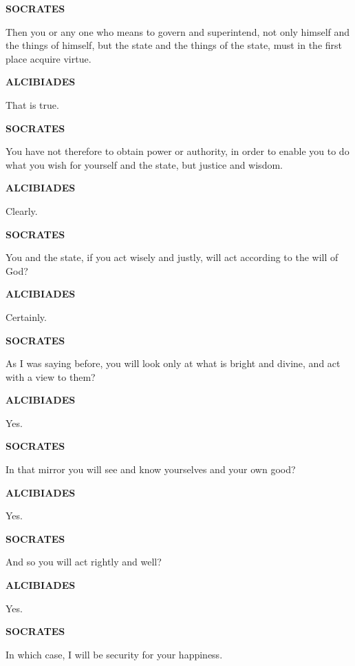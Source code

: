 \documentclass[11pt,letter]{article}
\begin{document}
\par \textbf{SOCRATES}
\par   Then you or any one who means to govern and superintend, not only himself and the things of himself, but the state and the things of the state, must in the first place acquire virtue.

\par \textbf{ALCIBIADES}
\par   That is true.

\par \textbf{SOCRATES}
\par   You have not therefore to obtain power or authority, in order to enable you to do what you wish for yourself and the state, but justice and wisdom.

\par \textbf{ALCIBIADES}
\par   Clearly.

\par \textbf{SOCRATES}
\par   You and the state, if you act wisely and justly, will act according to the will of God?

\par \textbf{ALCIBIADES}
\par   Certainly.

\par \textbf{SOCRATES}
\par   As I was saying before, you will look only at what is bright and divine, and act with a view to them?

\par \textbf{ALCIBIADES}
\par   Yes.

\par \textbf{SOCRATES}
\par   In that mirror you will see and know yourselves and your own good?

\par \textbf{ALCIBIADES}
\par   Yes.

\par \textbf{SOCRATES}
\par   And so you will act rightly and well?

\par \textbf{ALCIBIADES}
\par   Yes.

\par \textbf{SOCRATES}
\par   In which case, I will be security for your happiness.
\end{document}
